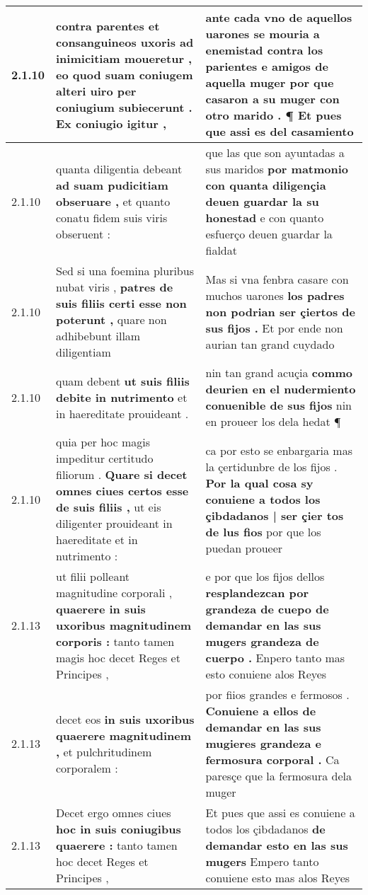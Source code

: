 \begin{tabular}{|p{1cm}|p{6.5cm}|p{6.5cm}|}
2.1.10 & contra parentes et consanguineos uxoris ad inimicitiam moueretur , \textbf{ eo quod suam coniugem alteri uiro per coniugium subiecerunt . } Ex coniugio igitur , & ante cada vno de aquellos uarones se mouria a enemistad contra los parientes e amigos de aquella muger \textbf{ por que casaron a su muger con otro marido . } ¶ Et pues que assi es del casamiento \\\hline
2.1.10 & quanta diligentia debeant \textbf{ ad suam pudicitiam obseruare , } et quanto conatu fidem suis viris obseruent : & que las que son ayuntadas a sus maridos \textbf{ por matmonio con quanta diligençia deuen guardar la su honestad } e con quanto esfuerço deuen guardar la fialdat \\\hline
2.1.10 & Sed si una foemina pluribus nubat viris , \textbf{ patres de suis filiis certi esse non poterunt , } quare non adhibebunt illam diligentiam & Mas si vna fenbra casare con muchos uarones \textbf{ los padres non podrian ser çiertos de sus fijos . } Et por ende non aurian tan grand cuydado \\\hline
2.1.10 & quam debent \textbf{ ut suis filiis debite in nutrimento } et in haereditate prouideant . & nin tan grand acuçia \textbf{ commo deurien en el nudermiento conuenible de sus fijos } nin en proueer los dela hedat ¶ \\\hline
2.1.10 & quia per hoc magis impeditur certitudo filiorum . \textbf{ Quare si decet omnes ciues certos esse de suis filiis , } ut eis diligenter prouideant in haereditate et in nutrimento : & ca por esto se enbargaria mas la çertidunbre de los fijos . \textbf{ Por la qual cosa sy conuiene a todos los çibdadanos | ser çier tos de lus fios } por que los puedan proueer \\\hline
2.1.13 & ut filii polleant magnitudine corporali , \textbf{ quaerere in suis uxoribus magnitudinem corporis : } tanto tamen magis hoc decet Reges et Principes , & e por que los fijos dellos \textbf{ resplandezcan por grandeza de cuepo de demandar en las sus mugers grandeza de cuerpo . } Enpero tanto mas esto conuiene alos Reyes \\\hline
2.1.13 & decet eos \textbf{ in suis uxoribus quaerere magnitudinem , } et pulchritudinem corporalem : & por fiios grandes e fermosos . \textbf{ Conuiene a ellos de demandar en las sus mugieres grandeza e fermosura corporal . } Ca paresçe que la fermosura dela muger \\\hline
2.1.13 & Decet ergo omnes ciues \textbf{ hoc in suis coniugibus quaerere : } tanto tamen hoc decet Reges et Principes , & Et pues que assi es conuiene a todos los çibdadanos \textbf{ de demandar esto en las sus mugers } Empero tanto conuiene esto mas alos Reyes \\\hline

\end{tabular}
